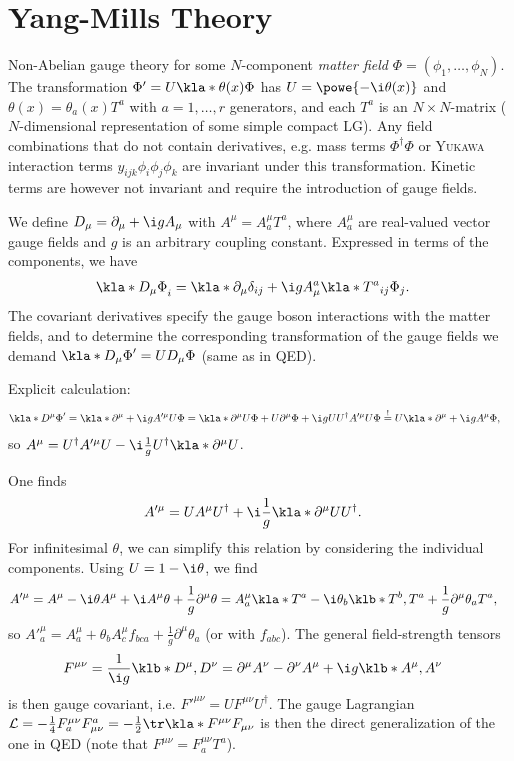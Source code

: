 \documentclass[english, parskip=full]{scrbook}
\newcommand{\note}[1]{\begin{tcolorbox}[colback=colorbackgroundnote,colframe=colornote, breakable,enhanced]#1\end{tcolorbox}}
\begin{document}
\section{Yang-Mills Theory}
Non-Abelian gauge theory for some $N$-component \emph{matter field} $\Phi=(\phi_1,\dots,\phi_N)$.
The transformation $\Phi'=U\kla*{\theta(x)} \Phi$ has $U=\powe{-\i \theta(x)}$ and $\theta(x)=\theta_a(x)T^a$ with $a=1,\dots,r$ generators, and each $T^a$ is an $N\times N$-matrix ($N$-dimensional representation of some simple compact LG).
Any field combinations that do not contain derivatives, e.g. mass terms $\Phi^\dagger \Phi$ or \textsc{Yukawa} interaction terms $y_{ijk} \phi_i\phi_j\phi_k$ are invariant under this transformation.
Kinetic terms are however not invariant and require the introduction of gauge fields.

We define $D_\mu=\partial_\mu + \i gA_\mu$ with $A^\mu = A^\mu_a T^a$, where $A^\mu_a$ are real-valued vector gauge fields and $g$ is an arbitrary coupling constant.
Expressed in terms of the components, we have
\begin{align}
\kla*{D_\mu \Phi}_i &= \kla*{\partial_\mu \delta_{ij} + \i g A_\mu^a \kla*{T^a}_{ij} }\Phi_j.
\end{align}
The covariant derivatives specify the gauge boson interactions with the matter fields, and to determine the corresponding transformation of the gauge fields we demand $\kla*{D_\mu \Phi}' = UD_\mu\Phi$ (same as in QED).
\note{Explicit calculation:
\begin{align}
\kla*{D^\mu \Phi}' &= \kla*{\partial^\mu + \i g A'^\mu } U\Phi = \kla*{\partial^\mu U}\Phi + U\partial^\mu \Phi + \i g UU^\dagger A'^\mu U\Phi \overset{!}{=} U \kla*{\partial^\mu + \i g A^\mu }\Phi,
\end{align}
so $A^\mu = U^\dagger A'^\mu U -\i \frac{1}{g} U^\dagger \kla*{\partial^\mu U}$.
}
One finds
\begin{align}
A'^\mu &= U A^\mu U^\dagger + \i \frac{1}{g} \kla*{\partial^\mu U} U^\dagger.
\end{align}
For infinitesimal $\theta$, we can simplify this relation by considering the individual components.
Using $U=1 - \i \theta$, we find
\begin{align}
A'^\mu &= A^\mu - \i \theta A^\mu + \i A^\mu \theta + \frac{1}{g} \partial^\mu \theta = A^\mu_a \kla*{T^a - \i \theta_b \klb*{T^b,T^a}} + \frac{1}{g}\partial^\mu \theta_a T^a,
\end{align}
so $A'^\mu_a = A^\mu_a + \theta_b A^\mu_c f_{bca} + \frac{1}{g} \partial^\mu \theta_a$ (or with $f_{abc}$).
The general field-strength tensors
\begin{align}
F^{\mu\nu} &= \frac{1}{\i g} \klb*{D^\mu,D^\nu} = \partial^\mu A^\nu - \partial^\nu A^\mu +\i g \klb*{A^\mu,A^\nu }
\end{align}
is then gauge covariant, i.e. $F'^{\mu\nu} = UF^{\mu\nu}U^\dagger$.
The gauge Lagrangian $\mathcal{L} = -\frac{1}{4} F^{\mu\nu}_a F^a_{\mu\nu} = -\frac{1}{2} \tr\kla*{F^{\mu\nu} F_{\mu\nu}}$ is then the direct generalization of the one in QED (note that $F^{\mu\nu} = F^{\mu\nu}_a T^a$).
\end{document}
